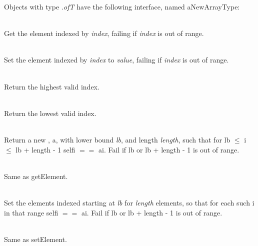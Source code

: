 \noindent Objects with type {\it {}.of\/\LB{}T\/\RB{}} have the
following interface, named aNewArrayType:

\begin{desc}
  \item[\kw{function}  getElement\/\LB{}index \CO{} \tn{Integer}\/\RB{} \returns{} \/\LB{}T\/\RB{}]~\\
    Get the element indexed by {\it index}, failing if {\it index} is out of range.
  \item[\kw{operation} setElement\/\LB{}index \CO \tn{Integer}, value \CO T\/\RB{}]~\\
    Set the element indexed by {\it index} to {\it value}, failing if {\it index} is out of range.
  \item[\kw{function}  upperbound \returns{} \/\LB{}\tn{Integer}\/\RB{}]~\\
    Return the highest valid index.
  \item[\kw{function}  lowerbound \returns{} \/\LB{}\tn{Integer}\/\RB{}]~\\
    Return the lowest valid index.
  \item[\kw{function}  getElement\/\LB{}lb \CO{} \tn{Integer}, length \CO{} \tn{Integer}\/\RB{} \returns{} \/\LB{}aNewArrayType\/\RB{}]~\\
    Return a new , a, with lower bound {\it lb}, and length {\it length}, such that for lb $\leq$ i $\leq$ lb + length - 1\CO{} self\LB{}i\/\RB{} $==$ a\LB{}i\/\RB{}.
    Fail if lb or lb + length - 1 is out of range.
  \item[\kw{function}  getSlice\/\LB{}lb \CO \tn{Integer}, length \CO \tn{Integer}\/\RB{} \returns{} \/\LB{}aNewArrayType\/\RB{}]~\\
    Same as getElement.
  \item[\kw{operation} setElement\/\LB{}lb \CO{} \tn{Integer}, length \CO{}
  \tn{Integer}, a \CO{} RIS\/\RB{}]~\\
    Set the elements indexed starting at {\it lb} for {\it length} elements,
    so that for each such i in that range\CO{}
    self\/\LB{}i\/\RB{} $==$ a\/\LB{}i\/\RB{}. Fail if
    lb or lb + length - 1 is out of range.
  \item[\kw{operation} setSlice\/\LB{}lb \CO{} \tn{Integer}, length \CO{}
  \tn{Integer}, a \CO{} Sequence.of\/\LB{}T\/\RB{}\/\RB{}]~\\
    Same as setElement.
  \item[\kw{operation} slideTo\/\LB{}newlb \CO{} \tn{Integer}\/\RB{}]~\\

\end{desc}
